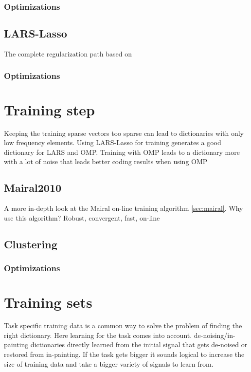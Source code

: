 \subsubsection*{Optimizations}


\subsection{LARS-Lasso}
The complete regularization path based on \cite{Efron2004}
\subsubsection*{Optimizations}


\section{Training step}
Keeping the training sparse vectors too sparse can lead to dictionaries with only low frequency elements.
Using LARS-Lasso for training generates a good dictionary for LARS and OMP. 
Training with OMP leads to a dictionary more with a lot of noise 
that leads better coding results when using OMP 

\subsection{Mairal2010}
A more in-depth look at the Mairal on-line training algorithm \ref{sec:mairal}. 
Why use this algorithm? Robust, convergent, fast, on-line


\subsection{Clustering}
\subsubsection*{Optimizations}



\section{Training sets}
Task specific training data is a common way to solve the problem of finding the right dictionary. 
Here learning for the task comes into account. de-noising/in-painting dictionaries directly learned from the initial
signal that gets de-noised or restored from in-painting.
If the task gets bigger it sounds logical to increase the size of training data and take a bigger variety of signals to learn from.



